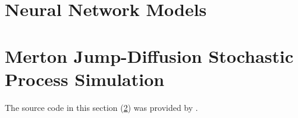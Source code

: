 \documentclass[11pt,oneside,openany,a4paper,english, report, goldenblock
]{usthesis}
\begin{document}
\section{Neural Network Models}


\newpage
\section{Merton Jump-Diffusion Stochastic Process Simulation}
\label{appendix:source_code:merton_simulation}
The source code in this section (\ref{appendix:source_code:merton_simulation}) was provided by \cite{reid}.

\end{document}
